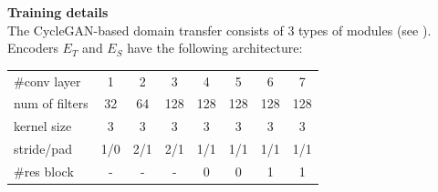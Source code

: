 \bigskip\indent\textbf{Training details}  \\
\label{sect:training}
The CycleGAN-based domain transfer consists of $3$ types of modules (see ).
Encoders $E_T$ and $E_S$ have the following architecture:
\begin{center}
\begin{scriptsize}
\begin{tabular}{l | c c c c c c c}
\hline
  \#conv layer      &1   &2      &3    &4     &5    &6    &7     \\
  num of filters    &32  &64     &128  &128   &128  &128  & 128  \\
  kernel size       &3   &3      &3    &3     & 3   &3    &3     \\
  stride/pad        &1/0 &2/1    &2/1  &1/1   &1/1  &1/1  & 1/1  \\
  \#res block       & -  & -     & -   & 0    &0    &1    &1     \\
\hline
\end{tabular}
\end{scriptsize}
\end{center}
\vspace{0.5em}



